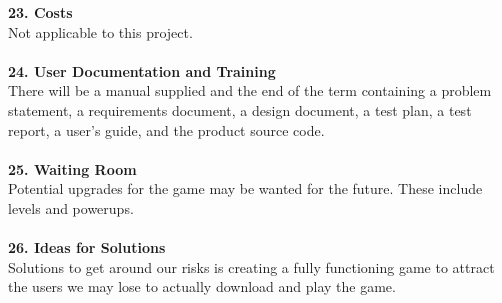 \documentclass[12pt]{article}
\begin{document}
\textbf{23. Costs}\\
Not applicable to this project.\\\\
\textbf{24. User Documentation and Training}\\
There will be a manual supplied and the end of the term containing a problem statement, a requirements document, a design document, a test plan, a test
report, a user's guide, and the product source code.\\\\
\textbf{25. Waiting Room}\\
Potential upgrades for the game may be wanted for the future.  These include levels and powerups.\\\\
\textbf{26. Ideas for Solutions}\\
Solutions to get around our risks is creating a fully functioning game to attract the users we may lose to actually download and play the game.\\\\
\end{document}

